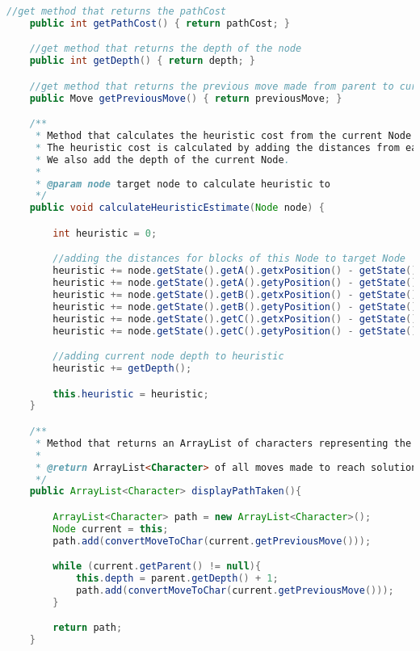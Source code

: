 \documentclass[a4paper, 11pt]{article} %
\begin{document}
\begin{lstlisting}[language=java]
    //get method that returns the pathCost
    public int getPathCost() { return pathCost; }

    //get method that returns the depth of the node
    public int getDepth() { return depth; }

    //get method that returns the previous move made from parent to current Node
    public Move getPreviousMove() { return previousMove; }

    /**
     * Method that calculates the heuristic cost from the current Node (this) to a target node.
     * The heuristic cost is calculated by adding the distances from each block of this Node to the target Node.
     * We also add the depth of the current Node.
     *
     * @param node target node to calculate heuristic to
     */
    public void calculateHeuristicEstimate(Node node) {

        int heuristic = 0;

        //adding the distances for blocks of this Node to target Node
        heuristic += node.getState().getA().getxPosition() - getState().getA().getxPosition();
        heuristic += node.getState().getA().getyPosition() - getState().getA().getyPosition();
        heuristic += node.getState().getB().getxPosition() - getState().getB().getxPosition();
        heuristic += node.getState().getB().getyPosition() - getState().getB().getyPosition();
        heuristic += node.getState().getC().getxPosition() - getState().getC().getxPosition();
        heuristic += node.getState().getC().getyPosition() - getState().getC().getyPosition();

        //adding current node depth to heuristic
        heuristic += getDepth();

        this.heuristic = heuristic;
    }

    /**
     * Method that returns an ArrayList of characters representing the moves made from the root to the current Node.
     *
     * @return ArrayList<Character> of all moves made to reach solutions
     */
    public ArrayList<Character> displayPathTaken(){

        ArrayList<Character> path = new ArrayList<Character>();
        Node current = this;
        path.add(convertMoveToChar(current.getPreviousMove()));

        while (current.getParent() != null){
            this.depth = parent.getDepth() + 1;
            path.add(convertMoveToChar(current.getPreviousMove()));
        }

        return path;
    }


\end{lstlisting}
\end{document}
